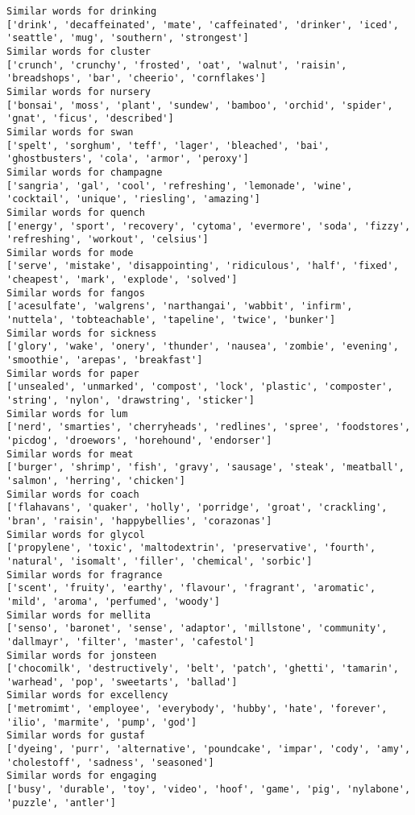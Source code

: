 \documentclass[11pt]{article}
\begin{document}
\begin{Verbatim}[commandchars=\\\{\}]
Similar words for drinking
['drink', 'decaffeinated', 'mate', 'caffeinated', 'drinker', 'iced', 'seattle', 'mug', 'southern', 'strongest']
Similar words for cluster
['crunch', 'crunchy', 'frosted', 'oat', 'walnut', 'raisin', 'breadshops', 'bar', 'cheerio', 'cornflakes']
Similar words for nursery
['bonsai', 'moss', 'plant', 'sundew', 'bamboo', 'orchid', 'spider', 'gnat', 'ficus', 'described']
Similar words for swan
['spelt', 'sorghum', 'teff', 'lager', 'bleached', 'bai', 'ghostbusters', 'cola', 'armor', 'peroxy']
Similar words for champagne
['sangria', 'gal', 'cool', 'refreshing', 'lemonade', 'wine', 'cocktail', 'unique', 'riesling', 'amazing']
Similar words for quench
['energy', 'sport', 'recovery', 'cytoma', 'evermore', 'soda', 'fizzy', 'refreshing', 'workout', 'celsius']
Similar words for mode
['serve', 'mistake', 'disappointing', 'ridiculous', 'half', 'fixed', 'cheapest', 'mark', 'explode', 'solved']
Similar words for fangos
['acesulfate', 'walgrens', 'narthangai', 'wabbit', 'infirm', 'nuttela', 'tobteachable', 'tapeline', 'twice', 'bunker']
Similar words for sickness
['glory', 'wake', 'onery', 'thunder', 'nausea', 'zombie', 'evening', 'smoothie', 'arepas', 'breakfast']
Similar words for paper
['unsealed', 'unmarked', 'compost', 'lock', 'plastic', 'composter', 'string', 'nylon', 'drawstring', 'sticker']
Similar words for lum
['nerd', 'smarties', 'cherryheads', 'redlines', 'spree', 'foodstores', 'picdog', 'droewors', 'horehound', 'endorser']
Similar words for meat
['burger', 'shrimp', 'fish', 'gravy', 'sausage', 'steak', 'meatball', 'salmon', 'herring', 'chicken']
Similar words for coach
['flahavans', 'quaker', 'holly', 'porridge', 'groat', 'crackling', 'bran', 'raisin', 'happybellies', 'corazonas']
Similar words for glycol
['propylene', 'toxic', 'maltodextrin', 'preservative', 'fourth', 'natural', 'isomalt', 'filler', 'chemical', 'sorbic']
Similar words for fragrance
['scent', 'fruity', 'earthy', 'flavour', 'fragrant', 'aromatic', 'mild', 'aroma', 'perfumed', 'woody']
Similar words for mellita
['senso', 'baronet', 'sense', 'adaptor', 'millstone', 'community', 'dallmayr', 'filter', 'master', 'cafestol']
Similar words for jonsteen
['chocomilk', 'destructively', 'belt', 'patch', 'ghetti', 'tamarin', 'warhead', 'pop', 'sweetarts', 'ballad']
Similar words for excellency
['metromimt', 'employee', 'everybody', 'hubby', 'hate', 'forever', 'ilio', 'marmite', 'pump', 'god']
Similar words for gustaf
['dyeing', 'purr', 'alternative', 'poundcake', 'impar', 'cody', 'amy', 'cholestoff', 'sadness', 'seasoned']
Similar words for engaging
['busy', 'durable', 'toy', 'video', 'hoof', 'game', 'pig', 'nylabone', 'puzzle', 'antler']

\end{Verbatim}
\end{document}

